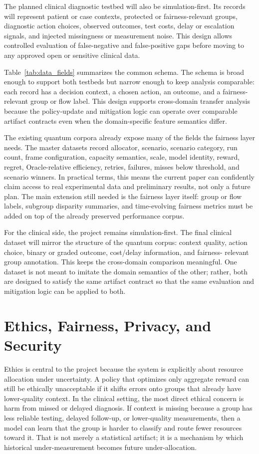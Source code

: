 \documentclass[conference]{IEEEtran}
\begin{document}
The planned clinical diagnostic testbed will also be simulation-first. Its
records will represent patient or case contexts, protected or fairness-relevant
groups, diagnostic action choices, observed outcomes, test costs, delay or
escalation signals, and injected missingness or measurement noise. This design
allows controlled evaluation of false-negative and false-positive gaps before
moving to any approved open or sensitive clinical data.

Table~\ref{tab:data_fields} summarizes the common schema. The schema is broad
enough to support both testbeds but narrow enough to keep analysis comparable:
each record has a decision context, a chosen action, an outcome, and a
fairness-relevant group or flow label. This design supports cross-domain
transfer analysis because the policy-update and mitigation logic can operate
over comparable artifact contracts even when the domain-specific feature
semantics differ.

The existing quantum corpora already expose many of the fields the fairness
layer needs. The master datasets record allocator, scenario, scenario category,
run count, frame configuration, capacity semantics, scale, model identity,
reward, regret, Oracle-relative efficiency, retries, failures, misses below
threshold, and scenario winners. In practical terms, this means the current
paper can confidently claim access to real experimental data and preliminary
results, not only a future plan. The main extension still needed is the
fairness layer itself: group or flow labels, subgroup disparity summaries, and
time-evolving fairness metrics must be added on top of the already preserved
performance corpus.

For the clinical side, the project remains simulation-first. The final clinical
dataset will mirror the structure of the quantum corpus: context quality,
action choice, binary or graded outcome, cost/delay information, and fairness-
relevant group annotation. This keeps the cross-domain comparison meaningful.
One dataset is not meant to imitate the domain semantics of the other; rather,
both are designed to satisfy the same artifact contract so that the same
evaluation and mitigation logic can be applied to both.

\section{Ethics, Fairness, Privacy, and Security}
Ethics is central to the project because the system is explicitly about
resource allocation under uncertainty. A policy that optimizes only aggregate
reward can still be ethically unacceptable if it shifts errors onto groups that
already have lower-quality context. In the clinical setting, the most direct
ethical concern is harm from missed or delayed diagnosis. If context is missing
because a group has less reliable testing, delayed follow-up, or lower-quality
measurements, then a model can learn that the group is harder to classify and
route fewer resources toward it. That is not merely a statistical artifact; it
is a mechanism by which historical under-measurement becomes future
under-allocation.
\end{document}
